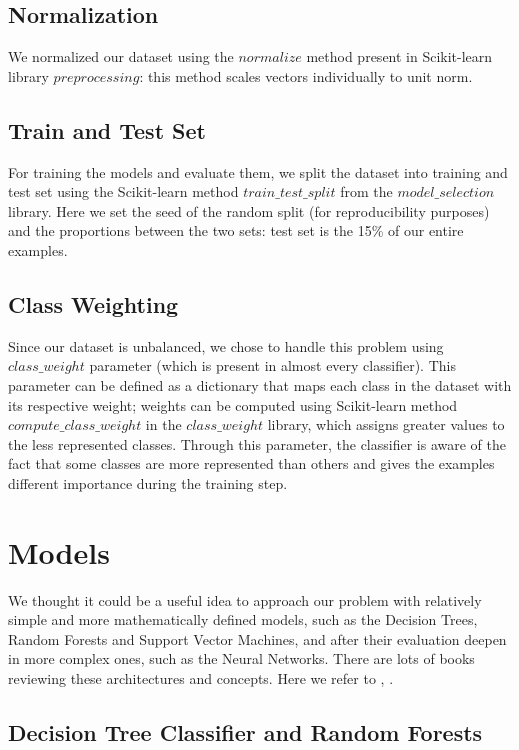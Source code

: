 \documentclass[12pt]{article}
\begin{document}
\subsection{Normalization}
We normalized our dataset using the $normalize$ method present in Scikit-learn library $preprocessing$: this method scales vectors individually to unit norm. 


\subsection{Train and Test Set}

For training the models and evaluate them, we split the dataset into training and test set using the Scikit-learn method \cite{sk} $train\_test\_split$ from the $model\_selection$ library. Here we set the seed of the random split (for reproducibility purposes) and the proportions between the two sets: test set is the 15\% of our entire examples.


\subsection{Class Weighting}
Since our dataset is unbalanced, we chose to handle this problem using $class\_weight$ parameter (which is present in almost every classifier). This parameter can be defined as a dictionary that maps each class in the dataset with its respective weight; weights can be computed using Scikit-learn method $compute\_class\_weight$ in the $class\_weight$ library, which assigns greater values to the less represented classes. Through this parameter, the classifier is aware of the fact that some classes are more represented than others and gives the examples different importance during the training step.


\newpage
\section{Models}
We thought it could be a useful idea to approach our problem with relatively simple and more mathematically defined models, such as the Decision Trees, Random Forests and Support Vector Machines, and after their evaluation deepen in more complex ones, such as the Neural Networks. 
There are lots of books reviewing these architectures and concepts. Here we refer to \cite{geron2017hands} , \cite{bishop2006pattern} \cite{hertz1991introduction}.


\subsection{Decision Tree Classifier and Random Forests}
\end{document}
